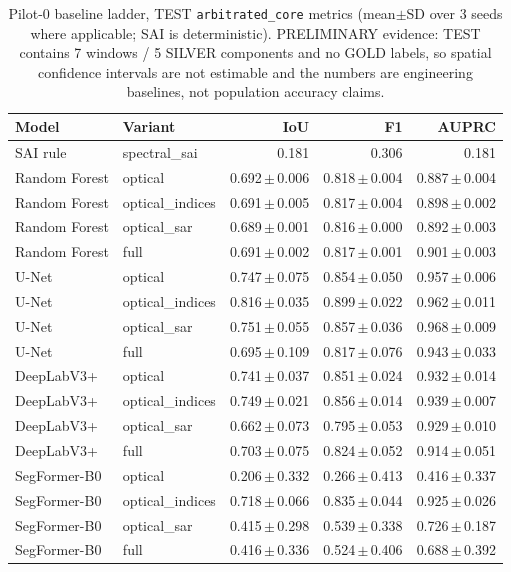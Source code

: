 \begin{table}[t]
\centering
\small
\caption{Pilot-0 baseline ladder, TEST \texttt{arbitrated\_core} metrics
(mean$\pm$SD over 3 seeds where applicable; SAI is deterministic).
PRELIMINARY evidence: TEST contains 7 windows / 5 SILVER components and
no GOLD labels, so spatial confidence intervals are not estimable and
the numbers are engineering baselines, not population accuracy claims.}
\label{tab:pilot0}
\begin{tabular}{llrrr}
\toprule
Model & Variant & IoU & F1 & AUPRC \\
\midrule
SAI rule & spectral\_sai & 0.181 & 0.306 & 0.181 \\
Random Forest & optical & 0.692\,$\pm$\,0.006 & 0.818\,$\pm$\,0.004 & 0.887\,$\pm$\,0.004 \\
Random Forest & optical\_indices & 0.691\,$\pm$\,0.005 & 0.817\,$\pm$\,0.004 & 0.898\,$\pm$\,0.002 \\
Random Forest & optical\_sar & 0.689\,$\pm$\,0.001 & 0.816\,$\pm$\,0.000 & 0.892\,$\pm$\,0.003 \\
Random Forest & full & 0.691\,$\pm$\,0.002 & 0.817\,$\pm$\,0.001 & 0.901\,$\pm$\,0.003 \\
U-Net & optical & 0.747\,$\pm$\,0.075 & 0.854\,$\pm$\,0.050 & 0.957\,$\pm$\,0.006 \\
U-Net & optical\_indices & 0.816\,$\pm$\,0.035 & 0.899\,$\pm$\,0.022 & 0.962\,$\pm$\,0.011 \\
U-Net & optical\_sar & 0.751\,$\pm$\,0.055 & 0.857\,$\pm$\,0.036 & 0.968\,$\pm$\,0.009 \\
U-Net & full & 0.695\,$\pm$\,0.109 & 0.817\,$\pm$\,0.076 & 0.943\,$\pm$\,0.033 \\
DeepLabV3+ & optical & 0.741\,$\pm$\,0.037 & 0.851\,$\pm$\,0.024 & 0.932\,$\pm$\,0.014 \\
DeepLabV3+ & optical\_indices & 0.749\,$\pm$\,0.021 & 0.856\,$\pm$\,0.014 & 0.939\,$\pm$\,0.007 \\
DeepLabV3+ & optical\_sar & 0.662\,$\pm$\,0.073 & 0.795\,$\pm$\,0.053 & 0.929\,$\pm$\,0.010 \\
DeepLabV3+ & full & 0.703\,$\pm$\,0.075 & 0.824\,$\pm$\,0.052 & 0.914\,$\pm$\,0.051 \\
SegFormer-B0 & optical & 0.206\,$\pm$\,0.332 & 0.266\,$\pm$\,0.413 & 0.416\,$\pm$\,0.337 \\
SegFormer-B0 & optical\_indices & 0.718\,$\pm$\,0.066 & 0.835\,$\pm$\,0.044 & 0.925\,$\pm$\,0.026 \\
SegFormer-B0 & optical\_sar & 0.415\,$\pm$\,0.298 & 0.539\,$\pm$\,0.338 & 0.726\,$\pm$\,0.187 \\
SegFormer-B0 & full & 0.416\,$\pm$\,0.336 & 0.524\,$\pm$\,0.406 & 0.688\,$\pm$\,0.392 \\
\bottomrule
\end{tabular}
\end{table}
